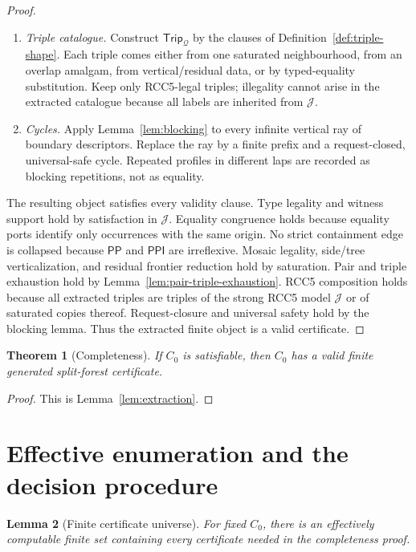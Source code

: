 \documentclass[11pt]{article}
\newtheorem{theorem}{Theorem}[section]
\newtheorem{lemma}[theorem]{Lemma}
\newcommand{\PP}{\mathsf{PP}}
\newcommand{\PPI}{\mathsf{PPI}}
\newcommand{\J}{\mathcal J}
\newcommand{\Q}{\mathcal Q}
\newcommand{\Trip}{\mathsf{Trip}}
\begin{document}
\begin{proof}
\begin{enumerate}[label=(E\arabic*)]
\item \emph{Triple catalogue.}  Construct $\Trip_\Q$ by the clauses of Definition~\ref{def:triple-shape}.  Each triple comes either from one saturated neighbourhood, from an overlap amalgam, from vertical/residual data, or by typed-equality substitution.  Keep only RCC5-legal triples; illegality cannot arise in the extracted catalogue because all labels are inherited from $\J$.
\item \emph{Cycles.}  Apply Lemma~\ref{lem:blocking} to every infinite vertical ray of boundary descriptors.  Replace the ray by a finite prefix and a request-closed, universal-safe cycle.  Repeated profiles in different laps are recorded as blocking repetitions, not as equality.
\end{enumerate}

The resulting object satisfies every validity clause.  Type legality and witness support hold by satisfaction in $\J$.  Equality congruence holds because equality ports identify only occurrences with the same origin.  No strict containment edge is collapsed because $\PP$ and $\PPI$ are irreflexive.  Mosaic legality, side/tree verticalization, and residual frontier reduction hold by saturation.  Pair and triple exhaustion hold by Lemma~\ref{lem:pair-triple-exhaustion}.  RCC5 composition holds because all extracted triples are triples of the strong RCC5 model $\J$ or of saturated copies thereof.  Request-closure and universal safety hold by the blocking lemma.  Thus the extracted finite object is a valid certificate.
\end{proof}


\begin{theorem}[Completeness]\label{thm:completeness}
If $C_0$ is satisfiable, then $C_0$ has a valid finite generated split-forest certificate.
\end{theorem}

\begin{proof}
This is Lemma~\ref{lem:extraction}.
\end{proof}

\section{Effective enumeration and the decision procedure}

\begin{lemma}[Finite certificate universe]\label{lem:finite-universe}
For fixed $C_0$, there is an effectively computable finite set containing every certificate needed in the completeness proof.
\end{lemma}
\end{document}

